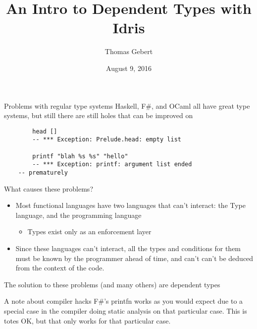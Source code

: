 \documentclass{beamer}
\title{An Intro to Dependent Types with Idris}
\subtitle{}
\author{Thomas Gebert}
\date{August 9, 2016}
\begin{document}
  \frame{\titlepage}
\begin{frame}[fragile]{Problems with regular type systems}
	Haskell, F\#, and OCaml all have great type systems, but still there are still holes that can be improved on
	\begin{lstlisting}
		head []
		-- *** Exception: Prelude.head: empty list

		printf "blah %s %s" "hello"
		-- *** Exception: printf: argument list ended 
    -- prematurely
	\end{lstlisting}

\end{frame}
  \begin{frame}{What causes these problems?}
	  \begin{itemize}
		\item Most functional languages have two languages that can't interact: the Type language, and the programming language \begin{itemize}
			\item Types exist only as an enforcement layer
			\end{itemize}
		\item Since these languages can't interact, all the types and conditions for them must be known by the programmer ahead of time, and can't can't be deduced from the context of the code.
	  \end{itemize}
  \end{frame}
\begin{frame}
\begin{center}
 The solution to these problems (and many others) are dependent types
\end{center}
\end{frame}
\begin{frame}{A note about compiler hacks}
  F\#'s printfn works as you would expect due to a special case in the compiler doing static analysis on that particular case. 
  \linebreak
  \linebreak
  This is totes OK, but that only works for that particular case.
\end{frame}
\end{document}
